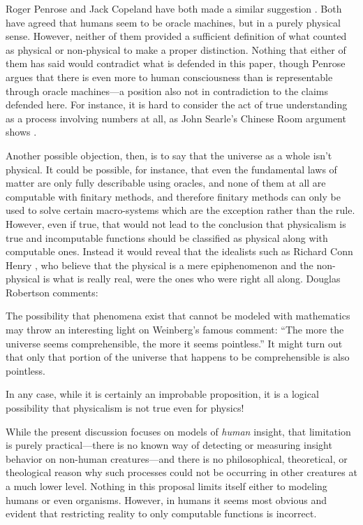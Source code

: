 Roger Penrose and Jack Copeland have both made a similar suggestion \citep{copeland1998, hodges2000}.  Both have agreed that humans seem to be oracle machines, but in a purely physical sense.  However, neither of them provided a sufficient definition of what counted as physical or non-physical to make a proper distinction.  Nothing that either of them has said would contradict what is defended in this paper, though Penrose argues that there is even more to human consciousness than is representable through oracle machines---a position also not in contradiction to the claims defended here.   For instance, it is hard to consider the act of true understanding as a process involving numbers at all, as John Searle's Chinese Room argument shows \citep{searle1980}.

Another possible objection, then, is to say that the universe as a whole isn't physical.  It could be possible, for instance, that even the fundamental laws of matter are only fully describable using oracles, and none of them at all are computable with finitary methods, and therefore finitary methods can only be used to solve certain macro-systems which are the exception rather than the rule.  However, even if true, that would not lead to the conclusion that physicalism is true and incomputable functions should be classified as physical along with computable ones.  Instead it would reveal that the idealists such as Richard Conn Henry \citeyearpar{henry2005}, who believe that the physical is a mere epiphenomenon and the non-physical is what is really real, were the ones who were right all along.  Douglas Robertson \citeyearpar{robertson1999} comments:

\begin{quoting}
The possibility that phenomena exist that cannot be modeled with mathematics may throw an interesting light on Weinberg's famous comment: ``The more the universe seems comprehensible, the more it seems pointless.'' It might turn out that only that portion of the universe that happens to be comprehensible is also pointless.
\end{quoting}

\noindent In any case, while it is certainly an improbable proposition, it is a logical possibility that physicalism is not true even for physics!  

While the present discussion focuses on models of \textit{human} insight, that limitation is purely practical---there is no known way of detecting or measuring insight behavior on non-human creatures---and there is no philosophical, theoretical, or theological reason why such processes could not be occurring in other creatures at a much lower level.  Nothing in this proposal limits itself either to modeling humans or even organisms.  However, in humans it seems most obvious and evident that restricting reality to only computable functions is incorrect.

